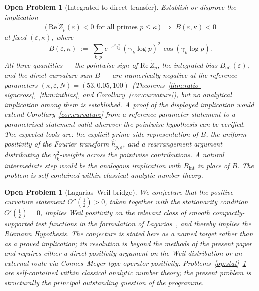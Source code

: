 \documentclass[11pt]{article}
\newtheorem{openproblem}[theorem]{Open Problem}
\newcommand{\Zt}{\widetilde{Z}}
\begin{document}
\begin{openproblem}[Integrated-to-direct transfer]
\label{op:transfer}
Establish or disprove the implication
\[
\bigl(\,\mathrm{Re}\,\Zt_p(\varepsilon)<0 \text{ for all primes }
p\le\kappa\,\bigr)
\;\Longrightarrow\;
B(\varepsilon,\kappa)<0
\]
at fixed $(\varepsilon,\kappa)$, where
\[
B(\varepsilon,\kappa) \;:=\; \sum_{k,p} e^{-\varepsilon^2\gamma_k^2}\,
(\gamma_k\log p)^2\,\cos(\gamma_k\log p).
\]
All three quantities --- the pointwise sign of
$\mathrm{Re}\,\Zt_p$, the integrated bias $B_{\mathrm{int}}(\varepsilon)$,
and the direct curvature sum $B$ --- are numerically negative at the
reference parameters $(\kappa,\varepsilon,N)=(53,0.05,100)$
(Theorems~\ref{thm:ratio-signcross},~\ref{thm:intbias}, and
Corollary~\ref{cor:curvature}), but no analytical implication among
them is established.
A proof of the displayed implication would extend
Corollary~\ref{cor:curvature} from a reference-parameter statement to
a parametrised statement valid wherever the pointwise hypothesis can
be verified.
The expected tools are: the explicit prime-side representation of $B$,
the uniform positivity of the Fourier transform
$\widehat{h}_{p,\varepsilon}$, and a rearrangement argument
distributing the $\gamma_k^2$-weights across the pointwise
contributions.
A natural intermediate step would be the analogous implication with
$B_{\mathrm{int}}$ in place of $B$.
The problem is self-contained within classical analytic number theory.
\end{openproblem}

\begin{openproblem}[Lagarias--Weil bridge]
\label{op:weil-bridge}
We conjecture that the positive-curvature statement
$O''(\tfrac12)>0$, taken together with the stationarity condition
$O'(\tfrac12)=0$, implies Weil positivity on the relevant class of
smooth compactly-supported test functions in the formulation of
Lagarias~\cite{Lagarias}, and thereby implies the Riemann Hypothesis.
The conjecture is stated here as a named target rather than as a
proved implication; its resolution is beyond the methods of the
present paper and requires either a direct positivity argument on the
Weil distribution or an external route via Connes--Meyer-type operator
positivity.
Problems~\ref{op:stat}--\ref{op:transfer} are self-contained within
classical analytic number theory; the present problem is structurally
the principal outstanding question of the programme.
\end{openproblem}

\end{document}

